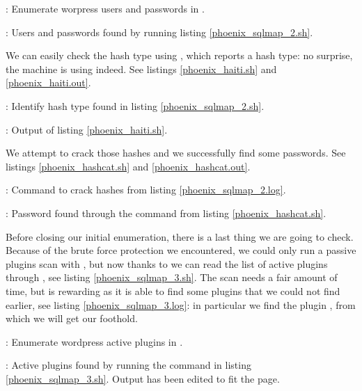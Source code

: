 \begin{listing}
  \caption{: Enumerate worpress users and passwords in .}
  \label{phoenix_sqlmap_2.sh}
\end{listing}
\begin{listing}
  
  \caption{: Users and passwords found by running listing \ref{phoenix_sqlmap_2.sh}.}
  \label{phoenix_sqlmap_2.log}
\end{listing}
\par We can easily check the hash type using , which reports a  hash type: no surprise, the machine is using  indeed. See listings \ref{phoenix_haiti.sh} and \ref{phoenix_haiti.out}.
\begin{listing}
  \caption{: Identify hash type found in listing \ref{phoenix_sqlmap_2.sh}.}
  \label{phoenix_haiti.sh}
\end{listing}
\begin{listing}
  
  \caption{: Output of listing \ref{phoenix_haiti.sh}.}
  \label{phoenix_haiti.out}
\end{listing}
\par We attempt to crack those hashes and we successfully find some passwords. See listings \ref{phoenix_hashcat.sh} and \ref{phoenix_hashcat.out}.
\begin{listing}
  \caption{: Command to crack hashes from listing \ref{phoenix_sqlmap_2.log}.}
  \label{phoenix_hashcat.sh}
\end{listing}
\begin{listing}
  
  \caption{: Password found through the command from listing \ref{phoenix_hashcat.sh}.}
  \label{phoenix_hashcat.out}
\end{listing}
\par Before closing our initial enumeration, there is a last thing we are going to check. Because of the brute force protection we encountered, we could only run a passive plugins scan with , but now thanks to  we can read the list of active plugins through , see listing \ref{phoenix_sqlmap_3.sh}. The scan needs a fair amount of time, but is rewarding as it is able to find some plugins that we could not find earlier, see listing \ref{phoenix_sqlmap_3.log}: in particular we find the plugin , from which we will get our foothold.
\begin{listing}
  \caption{: Enumerate wordpress active plugins in .}
  \label{phoenix_sqlmap_3.sh}
\end{listing}
\begin{listing}
  
  \caption{: Active plugins found by running the command in listing \ref{phoenix_sqlmap_3.sh}. Output has been edited to fit the page.}
  \label{phoenix_sqlmap_3.log}
\end{listing}

